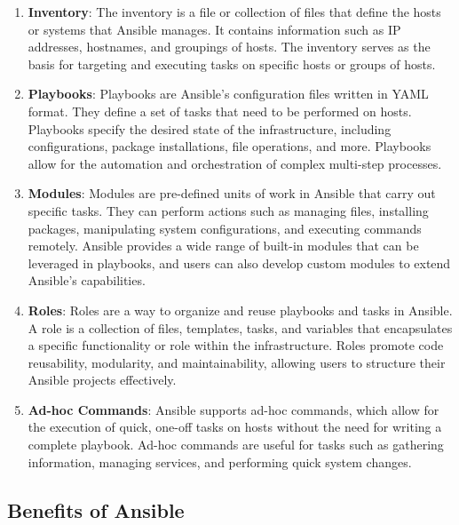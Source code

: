 \begin{enumerate}
    \item \textbf{Inventory}: The inventory is a file or collection of files that define the hosts or systems that Ansible manages. It contains information such as IP addresses, hostnames, and groupings of hosts. The inventory serves as the basis for targeting and executing tasks on specific hosts or groups of hosts.

    \item \textbf{Playbooks}: Playbooks are Ansible's configuration files written in YAML format. They define a set of tasks that need to be performed on hosts. Playbooks specify the desired state of the infrastructure, including configurations, package installations, file operations, and more. Playbooks allow for the automation and orchestration of complex multi-step processes.

    \item \textbf{Modules}: Modules are pre-defined units of work in Ansible that carry out specific tasks. They can perform actions such as managing files, installing packages, manipulating system configurations, and executing commands remotely. Ansible provides a wide range of built-in modules that can be leveraged in playbooks, and users can also develop custom modules to extend Ansible's capabilities.

    \item \textbf{Roles}: Roles are a way to organize and reuse playbooks and tasks in Ansible. A role is a collection of files, templates, tasks, and variables that encapsulates a specific functionality or role within the infrastructure. Roles promote code reusability, modularity, and maintainability, allowing users to structure their Ansible projects effectively.

    \item \textbf{Ad-hoc Commands}: Ansible supports ad-hoc commands, which allow for the execution of quick, one-off tasks on hosts without the need for writing a complete playbook. Ad-hoc commands are useful for tasks such as gathering information, managing services, and performing quick system changes.
\end{enumerate}

\subsection*{Benefits of Ansible}

